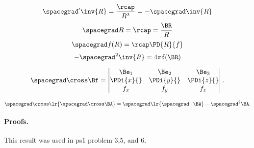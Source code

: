 %
%

\begin{equation}\label{eqn:usefulFormulas:620}
\spacegrad' \inv{R} = \frac{\rcap}{R^2} = -\spacegrad \inv{R}
\end{equation}
\begin{equation}\label{eqn:usefulFormulas:640}
\spacegrad R = \rcap = \frac{\BR}{R}
\end{equation}
\begin{equation}\label{eqn:usefulFormulas:660}
\spacegrad f(R) = \rcap \PD{R}{f}
\end{equation}
\begin{equation}\label{eqn:usefulFormulas:680}
-\spacegrad^2 \inv{R} = 4\pi \delta(\BR)
\end{equation}

\begin{dmath}\label{eqn:emtLecture1:60}
\spacegrad \cross \Bf
=
\begin{vmatrix}
\Be_1 & \Be_2 & \Be_3 \\
\PDi{x}{} &
\PDi{y}{} &
\PDi{z}{} \\
f_x & f_y & f_z
\end{vmatrix}.
\end{dmath}

\begin{equation}\label{eqn:usefulFormulas:700}
\spacegrad \cross \lr{ \spacegrad \cross \BA } = \spacegrad \lr{ \spacegrad \cdot \BA } - \spacegrad^2 \BA.
\end{equation}

\paragraph{Proofs.}

This result was used in ps1 problem 3,5, and 6.

